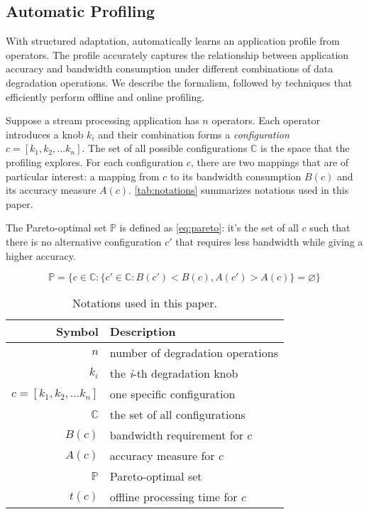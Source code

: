 \subsection{Automatic Profiling}
\label{sec:automatic-profiling}

With structured adaptation, \sysname{} automatically learns an application
profile from \maybe{} operators. The profile accurately captures the
relationship between application accuracy and bandwidth consumption under
different combinations of data degradation operations. We describe the
formalism, followed by techniques that efficiently perform offline and online
profiling.

 Suppose a stream processing application has $n$
\maybe{} operators. Each operator introduces a knob $k_i$ and their combination
forms a \textit{configuration} $c = [k_{1}, k_{2}, ... k_{n}]$. The set of all
possible configurations $\mathbb{C}$ is the space that the profiling
explores. For each configuration $c$, there are two mappings that are of
particular interest: a mapping from $c$ to its bandwidth consumption $B(c)$ and
its accuracy measure $A(c)$. \autoref{tab:notations} summarizes notations used
in this paper.

The Pareto-optimal set $\mathbb{P}$ is defined as \autoref{eq:pareto}: it's the
set of all $c$ such that there is no alternative configuration $c'$ that
requires less bandwidth while giving a higher accuracy.

{\small
  \vspace{-1em}
  \begin{equation}
  \mathbb{P} = \{ c \in \mathbb{C} : \{ c' \in \mathbb{C}: B(c') < B(c),
  A(c') > A(c) \} = \varnothing\}
  \label{eq:pareto}
\end{equation}
}%

\begin{table}
  \footnotesize
  \centering
  \begin{tabular}{r l}
    \toprule
    \textbf{Symbol} & \textbf{Description} \\
    \midrule
    $n$ & number of degradation operations \\
    $k_i$ & the \textit{i}-th degradation knob \\
    $c = [k_{1}, k_{2}, ... k_{n}]$ & one specific configuration \\
    $\mathbb{C}$ & the set of all configurations \\
    \midrule
    $B(c)$ & bandwidth requirement for $c$ \\
    $A(c)$ & accuracy measure for $c$ \\
    $\mathbb{P}$ & Pareto-optimal set \\
    \midrule
    $t(c)$ & offline processing time for $c$ \\
    \bottomrule
  \end{tabular}
  \caption{Notations used in this paper.}
  \label{tab:notations}
\end{table}

